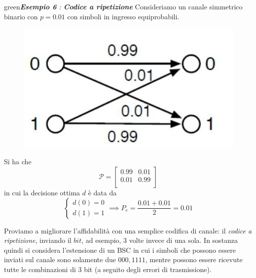 \begin{mybox}{green}{\textit{\textbf{Esempio 6} : \textbf{Codice a ripetizione}}}
Consideriamo un canale simmetrico binario con $p=0.01$ con simboli in ingresso equiprobabili.

\begin{minipage}{0.45\textwidth}
\begin{figure}[H]
    \centering
    \includegraphics[scale=0.3]{img/bscese.jpg}
\end{figure}
\end{minipage}
\begin{minipage}{0.45\textwidth}
Si ha che 
\begin{equation*}
    \mathcal{P} = \begin{bmatrix}
    0.99 & 0.01 \\
    0.01 & 0.99 \\
    \end{bmatrix}
\end{equation*}
in cui la decisione ottima $d$ \`e data da
\begin{equation*}
    \begin{cases}
    d(0) = 0 \\
    d(1) = 1
    \end{cases} \implies P_e = \frac{0.01 + 0.01}{2} = 0.01
\end{equation*}
\end{minipage}

\vspace{10pt}
Proviamo a migliorare l’affidabilità con una semplice codifica di canale: il \textit{codice a ripetizione}, inviando il $bit$, ad esempio, 3 volte invece di una sola. In sostanza quindi si considera l’estensione di un BSC in cui i simboli che possono essere inviati sul canale sono solamente due $000, 1111$, mentre possono essere ricevute tutte le combinazioni di 3 bit (a seguito degli errori di trasmissione).
\end{mybox}
